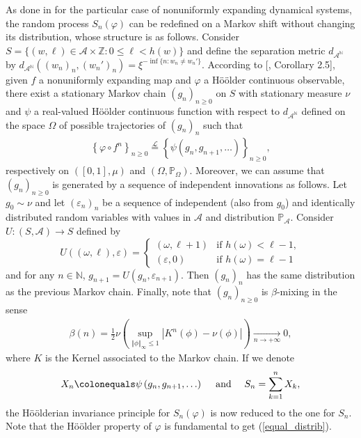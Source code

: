 \documentclass{ws-sd}
\newcommand{\Proba}{\mathbb{P}}
\newcommand{\law}{\mathcal{L}}
\newcommand{\N}{\mathbb{N}}
\newcommand{\norm}[1]{\left\Vert #1\right\Vert}
\newcommand{\abs}[1]{\left\lvert #1 \right\rvert}
\newcommand{\eqdef}{\colonequals}
\newcommand\bigp[1]{\left(#1\right)}
\newcommand{\eps}{\varepsilon}
\begin{document}
As done in \cite{4} for the particular case of nonuniformly expanding dynamical systems, the random process $S_{n}(\varphi)$ can be redefined on a Markov shift without changing its distribution, whose structure is as follows.
Consider $S=\{(w, \ell) \in \mathcal{A} \times \mathbb{Z}: 0 \le \ell<h(w)\} $ and define the separation metric $d_{\mathcal{A}^{\mathbb{N}}}$ by $d_{\mathcal{A}^{\mathbb{N}}}((w_n)_n,(w_n')_n) = \xi ^{-\inf \{ n : w_n \neq w_n' \}}$. According to [, Corollary 2.5], given $f$ a nonuniformly expanding map and $\varphi$ a H\"oölder continuous observable, there exist a stationary Markov chain $(g_n)_{n \ge 0}$ on $S$
with stationary measure $\nu$
and $\psi$ a real-valued H\"oölder continuous function with respect to  $d_{\mathcal{A}^{\mathbb{N}}}$ defined on the space $\Omega$ of possible trajectories of $(g_n)_n$ such that
    \begin{align}\label{equal_distrib}
        \left\{\varphi \circ f^{n}\right\}_{n \ge 0} \stackrel{\law}{=}\left\{\psi\left(g_{n}, g_{n+1}, \ldots\right)\right\}_{n \ge 0},
    \end{align}
respectively on $([0,1], \mu)$ and $(\Omega, \Proba_\Omega)$.
Moreover, we can assume that $\left(g_{n}\right)_{n \ge 0}$ is generated by a sequence of independent innovations as follows. Let $g_{0} \sim \nu$ and let $(\varepsilon_{n})_n$ be a sequence of independent (also from $g_{0}$) and identically distributed random variables with values in $\mathcal{A}$ and distribution $\mathbb{P}_{\mathcal{A}}$. Consider $U:(S, \mathcal A) \to S$ defined by
\begin{equation*}
    U((\omega, \ell), \varepsilon) = \left\{
    \begin{array}{ll}
        (\omega, \ell +1) & \text{if } h(\omega) < \ell -1, \\
        (\eps, 0) &  \text{if } h(\omega) = \ell -1
    \end{array}
    \right.
\end{equation*}
and for any $n\in \N$, $g_{n+1}=U\left(g_{n}, \varepsilon_{n+1}\right)$. Then $(g_n)_n$ has the same distribution as the previous Markov chain.
Finally, note that $\left(g_{n}\right)_{n \ge 0}$ is $\beta$-mixing in the sense
\begin{align*}
    \beta(n) = \frac 1 2 \nu \bigp{\underset{\norm{\phi}_\infty \le 1}{\sup}\abs{K^n(\phi) - \nu(\phi)}} \xrightarrow[n \to +\infty]{} 0,
\end{align*}
where $K$ is the Kernel associated to the Markov chain.
\noindent
If we denote
$$
X_{n} \eqdef \psi\left(g_{n}, g_{n+1}, \ldots\right) \quad \text { and } \quad S_{n}=\sum_{k=1}^{n} X_{k},
$$
the H\"oölderian invariance principle for $S_{n}(\varphi)$ is now reduced to the one for $S_{n}$. Note that the H\"oölder property of $\varphi$ is fundamental to get (\ref{equal_distrib}).
\end{document}
